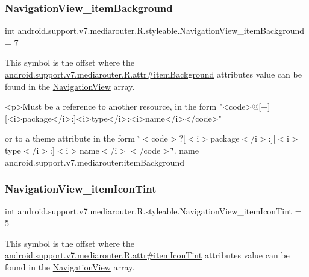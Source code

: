 \subsubsection{\texorpdfstring{Navigation\+View\+\_\+item\+Background}{NavigationView\_itemBackground}}
{\footnotesize\ttfamily int android.\+support.\+v7.\+mediarouter.\+R.\+styleable.\+Navigation\+View\+\_\+item\+Background = 7\hspace{0.3cm}{\ttfamily [static]}}

This symbol is the offset where the \hyperlink{classandroid_1_1support_1_1v7_1_1mediarouter_1_1R_1_1attr_ae9f584ebfd39f6050ec906e88cad7c0c}{android.\+support.\+v7.\+mediarouter.\+R.\+attr\#item\+Background} attribute\textquotesingle{}s value can be found in the \hyperlink{classandroid_1_1support_1_1v7_1_1mediarouter_1_1R_1_1styleable_a9216c77e145f14d4fdd264c2381fce44}{Navigation\+View} array.

\begin{DoxyVerb}      <p>Must be a reference to another resource, in the form "<code>@[+][<i>package</i>:]<i>type</i>:<i>name</i></code>"
\end{DoxyVerb}
 or to a theme attribute in the form \char`\"{}$<$code$>$?\mbox{[}$<$i$>$package$<$/i$>$\+:\mbox{]}\mbox{[}$<$i$>$type$<$/i$>$\+:\mbox{]}$<$i$>$name$<$/i$>$$<$/code$>$\char`\"{}.  name android.\+support.\+v7.\+mediarouter\+:item\+Background \mbox{\label{classandroid_1_1support_1_1v7_1_1mediarouter_1_1R_1_1styleable_aa391656f8e7f8b9e6d640d174be638d3}} 
\subsubsection{\texorpdfstring{Navigation\+View\+\_\+item\+Icon\+Tint}{NavigationView\_itemIconTint}}
{\footnotesize\ttfamily int android.\+support.\+v7.\+mediarouter.\+R.\+styleable.\+Navigation\+View\+\_\+item\+Icon\+Tint = 5\hspace{0.3cm}{\ttfamily [static]}}

This symbol is the offset where the \hyperlink{classandroid_1_1support_1_1v7_1_1mediarouter_1_1R_1_1attr_a78d0574accf4f52f2f8f0b04c9934fad}{android.\+support.\+v7.\+mediarouter.\+R.\+attr\#item\+Icon\+Tint} attribute\textquotesingle{}s value can be found in the \hyperlink{classandroid_1_1support_1_1v7_1_1mediarouter_1_1R_1_1styleable_a9216c77e145f14d4fdd264c2381fce44}{Navigation\+View} array.

